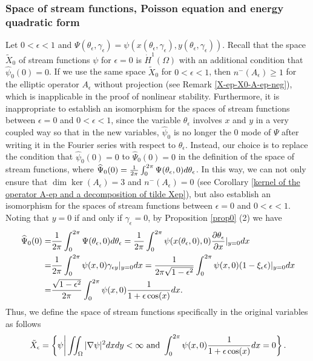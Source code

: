\documentclass[1 [leqno, 11pt]{amsart}
\numberwithin{equation}{section}
\let\ep=\epsilon
\begin{document}
\begin{CJK*}{GBK}{song}
\subsubsection{Space of stream functions, Poisson equation and energy quadratic form}
Let $0<\epsilon<1$ and $\Psi(\theta_\ep, \gamma_\ep) = \psi(x(\theta_\ep, \gamma_\ep),y(\theta_\ep, \gamma_\ep))$.
Recall that the space $\tilde X_0$ of stream functions $\psi$  for  $\ep = 0$ is $\dot{H}^1(\Omega)$ with an additional condition that $\widehat{\psi}_0(0)=0$. If we use the same space  $\tilde X_0$ for $0<\epsilon<1$, then
$n^-(A_\epsilon)\geq1$ for the elliptic operator $A_\epsilon$ without projection (see Remark \ref{X-ep-X0-A-ep-neg}), which is inapplicable in the proof of  nonlinear stability. Furthermore,
it is inappropriate to establish an isomorphism for the spaces  of stream functions   between $\epsilon=0$ and $0<\epsilon<1$, since the variable $\theta_\epsilon$ involves $x$ and $y$ in a very coupled way so  that in  the new variables, $\widehat{\psi}_0$ is no longer  the 0 mode of $\Psi$ after writing it in the Fourier series with respect to $\theta_\epsilon$.  Instead, our choice is to  replace the condition that $\widehat{\psi}_0(0)=0$  to $\widehat{\Psi}_0(0)=0$ in the definition of the space  of stream functions, where $\widehat{\Psi}_0(0)={1\over 2\pi}\int_{0}^{2\pi}\Psi(\theta_\epsilon,0)d\theta_\epsilon$. In this way, we can not only ensure that $\dim \ker (A_\epsilon)=3$ and $n^-(A_\epsilon)=0$ (see Corollary \ref{kernel of  the operator A-ep and a decomposition of tilde Xep}), but also establish an isomorphism for the spaces  of stream functions  between $\epsilon=0$ and $0<\epsilon<1$.  Noting that $y=0$ if and only if $\gamma_\epsilon=0$, by Proposition \ref{prop0} (2)  we have
\begin{align}\nonumber
\widehat{\Psi}_0(0)=&{1\over2\pi}\int_{0}^{2\pi}\Psi(\theta_\epsilon,0)d\theta_\epsilon={1\over2\pi}\int_{0}^{2\pi}\psi(x(\theta_\epsilon,0),0){\partial{\theta_\epsilon}\over \partial x}|_{y=0}dx\\\nonumber
=&{1\over2\pi}\int_{0}^{2\pi}\psi(x,0){\gamma_{\epsilon y}}|_{y=0}dx
={1\over2\pi\sqrt{1-\ep^2}}\int_{0}^{2\pi}\psi(x,0)(1-\xi_\ep \ep)|_{y=0}dx\\\label{widehat-Psi-to-psi-1+ep-cos}
=&{\sqrt{1-\ep^2}\over2\pi}\int_{0}^{2\pi}\psi(x,0){1\over1+\epsilon\cos(x)} dx.
\end{align}
Thus,  we define the space  of stream functions specifically in  the original variables as follows
\begin{align}\label{tilde-X-e}\tilde{X}_\ep = \left\{ \psi\bigg| \iint_\Omega |\nabla \psi|^2 dxdy <  \infty \text{ and } \int_{0}^{2\pi}\psi(x,0){1\over1+\epsilon\cos(x)} dx = 0  \right\}.\end{align}

\end{CJK*}
\end{document}
